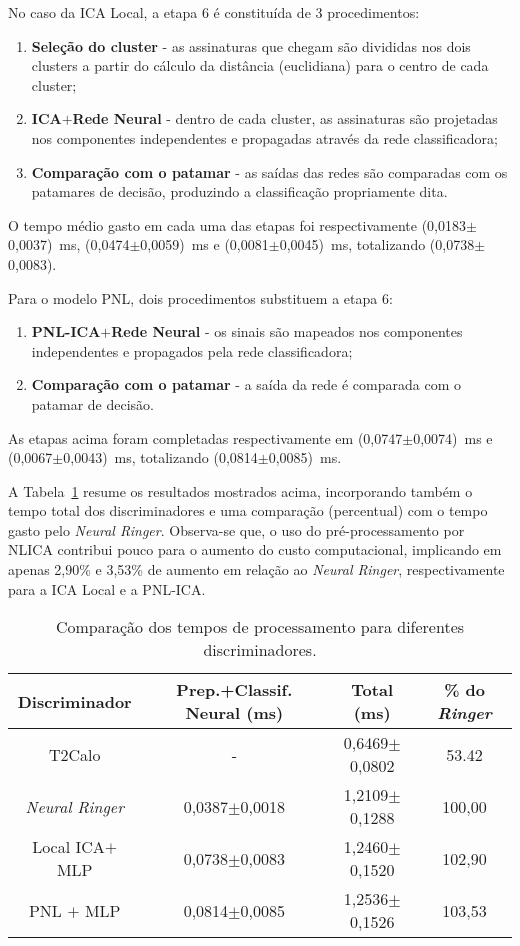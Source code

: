 No caso da ICA Local, a etapa 6 é constituída de 3 procedimentos:
\begin{enumerate}
    \item \textbf{Seleção do cluster} - as assinaturas que chegam
    são divididas nos dois clusters a partir do cálculo da
    distância (euclidiana) para o centro de cada cluster;
    \item \textbf{ICA$+$Rede Neural} - dentro de cada cluster, as
    assinaturas são projetadas nos componentes independentes e
    propagadas através da rede classificadora;
    \item \textbf{Comparação com o patamar} - as saídas das redes são
    comparadas com os patamares de decisão, produzindo a
    classificação propriamente dita.
\end{enumerate}
O tempo médio gasto em cada uma das etapas foi respectivamente
(0,0183$\pm$0,0037)~ms, (0,0474$\pm$0,0059)~ms e
(0,0081$\pm$0,0045)~ms, totalizando (0,0738$\pm$0,0083).

Para o modelo PNL, dois procedimentos substituem a etapa 6:
\begin{enumerate}
    \item \textbf{PNL-ICA$+$Rede Neural} - os sinais são mapeados
    nos componentes independentes e propagados pela rede
    classificadora;
    \item \textbf{Comparação com o patamar} - a saída da rede é
    comparada com o patamar de decisão.
\end{enumerate}
As etapas acima foram completadas respectivamente em
(0,0747$\pm$0,0074)~ms e (0,0067$\pm$0,0043)~ms, totalizando
(0,0814$\pm$0,0085)~ms.

A Tabela~\ref{tabExpTempo} resume os resultados mostrados acima,
incorporando também o tempo total dos discriminadores e uma
comparação (percentual) com o tempo gasto pelo \textit{Neural
Ringer}. Observa-se que, o uso do pré-processamento por NLICA
contribui pouco para o aumento do custo computacional, implicando
em apenas 2,90\% e 3,53\% de aumento em relação ao \textit{Neural
Ringer}, respectivamente para a ICA Local e a PNL-ICA.

\begin{table}[h!]
\centering \caption{Comparação dos tempos de processamento para
diferentes discriminadores.}\vspace{0.2cm} \footnotesize
\begin{tabular}{c|c|c|c}
    \hline
\textbf{Discriminador} & \textbf{Prep.+Classif. Neural} (ms)&
\textbf{Total} (ms) & \% do \textit{Ringer} \\
\hline
T2Calo & - & 0,6469$\pm$0,0802 & 53.42\\
\textit{Neural Ringer} & 0,0387$\pm$0,0018 & 1,2109$\pm$0,1288 & 100,00\\
Local ICA$+$MLP & 0,0738$\pm$0,0083 & 1,2460$\pm$0,1520 & 102,90\\
PNL $+$ MLP & 0,0814$\pm$0,0085 & 1,2536$\pm$0,1526 & 103,53\\
\hline
\end{tabular}
\label{tabExpTempo}
\end{table}


